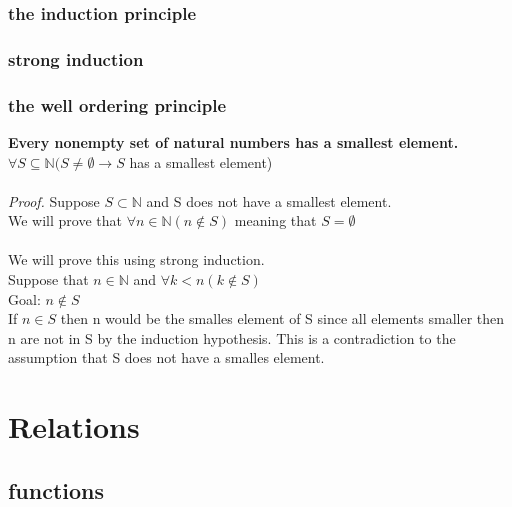 \documentclass[12pt, letterpaper]{article}
\begin{document}
\subsubsection{the induction principle}
\label{sec:the induction principle}

\subsubsection{strong induction}
\label{sec:strong induction}

\subsubsection{the well ordering principle}
\label{sec:the well ordering principle}
\textbf{Every nonempty set of natural numbers has a smallest element.}
\\

\begin{math}
	\forall S \subseteq \mathbb{N}(S \neq \emptyset \rightarrow S
\end{math}
 has a smallest element)
 \\\\
 \textit{Proof.}	Suppose $S \subset \mathbb{N}$ and S does not have a smallest element.\\
 We will prove that $\forall n\in \mathbb{N}(n \notin S)$ meaning that $ S=\emptyset$\\\\
 We will prove this using strong induction.\\
 Suppose that $n\in\mathbb{N}$ and $\forall k<n(k \notin S)$\\
 Goal: $n\notin S$
 \\
 If $n\in S$ then n would be the smalles element of S since all elements smaller then n are not in S by the induction hypothesis. This is a contradiction to the assumption that S does not have a smalles element.
 \newpage
 \section{Relations}
 \label{sec:Relations}
 \subsection{functions}
 \label{sec:functions}
 
\end{document}
